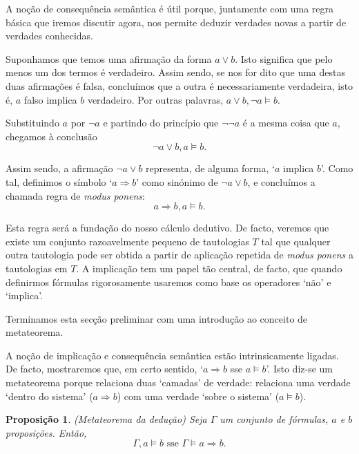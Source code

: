 \documentclass{report}
\newtheorem*{prop*}{Proposição}
\theoremstyle{definition}
\theoremstyle{remark}
\newcommand{\imply}{\mathbin{\Rightarrow}}
\begin{document}
	A noção de consequência semântica é útil porque, juntamente com uma regra básica que iremos discutir agora, nos permite deduzir verdades novas a partir de verdades conhecidas.
	
	Suponhamos que temos uma afirmação da forma $a \lor b$. Isto significa que pelo menos um dos termos é verdadeiro. Assim sendo, se nos for dito que uma destas duas afirmações é falsa, concluímos que a outra é necessariamente verdadeira, isto é, $a$ falso implica $b$ verdadeiro. Por outras palavras, $a \lor b, \neg a \vDash b$.
	
	Substituindo $a$ por $\neg a$ e partindo do princípio que $\neg \neg a$ é a mesma coisa que $a$, chegamos à conclusão
	\[\neg a \lor b, a \vDash b.\]
	
	Assim sendo, a afirmação $\neg a \lor b$ representa, de alguma forma, `$a$ implica $b$'. Como tal, definimos o símbolo `$a \imply b$' como sinónimo de $\neg a \lor b$, e concluímos a chamada regra de \textit{modus ponens}:
	\[a \imply b, a \vDash b.\]
	
	Esta regra será a fundação do nosso cálculo dedutivo. De facto, veremos que existe um conjunto razoavelmente pequeno de tautologias $T$ tal que qualquer outra tautologia pode ser obtida a partir de aplicação repetida de \textit{modus ponens} a tautologias em $T$. A implicação tem um papel tão central, de facto, que quando definirmos fórmulas rigorosamente usaremos como base os operadores `não' e `implica'.
	
	\smallskip
	
	Terminamos esta secção preliminar com uma introdução ao conceito de metateorema.
	
	A noção de implicação e consequência semântica estão intrinsicamente ligadas. De facto, mostraremos que, em certo sentido, `$a \imply b$ sse $a \vDash b$'. Isto diz-se um metateorema porque relaciona duas `camadas' de verdade: relaciona uma verdade `dentro do sistema' ($a \imply b$) com uma verdade `sobre o sistema' ($a \vDash b$).
	
	\begin{prop*}
	(Metateorema da dedução) Seja $\Gamma$ um conjunto de fórmulas, $a$ e $b$ proposições. Então,
	\[\Gamma, a \vDash b \text{ sse } \Gamma \vDash a \imply b.\]
	\end{prop*}
	
\end{document}
